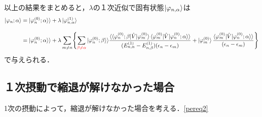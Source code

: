 以上の結果をまとめると，$\lambda$の１次近似で固有状態$\ket{\varphi_{n,\alpha}}$は
\begin{align}
    \ket{\varphi_{n};\alpha}
    &=|\varphi^{(0)}_n;\alpha\rangle\rangle
    +\lambda \ket{\varphi_{n,\alpha}^{(1)}}\\[10pt]
    &=
    |\varphi^{(0)}_n;\alpha\rangle\rangle
    +\lambda\sum_{m\neq n}
    \Biggl\{\sum_{\textcolor{red}{\beta\neq\alpha}}|\varphi^{(0)}_n;\beta\rangle\rangle
    \frac{\langle\braket{\varphi^{(0)}_{n};\beta|\hat{V}|\varphi^{(0)}_m}
    \braket{\varphi^{(0)}_{m}|\hat{V}|\varphi^{(0)}_n;\alpha}\rangle}
    {(E^{(1)}_{n,\alpha}-E^{(1)}_{n,\beta})(\epsilon_n-\epsilon_m)}
    +\ket{\varphi_m^{(0)}}\frac{\braket{\varphi^{(0)}_{m}|\hat{V}|\varphi^{(0)}_n;\alpha}\rangle}{(\epsilon_n-\epsilon_m)}
    \Biggr\}
\end{align}
で与えられる．


\subsection{１次摂動で縮退が解けなかった場合}
1次の摂動によって，縮退が解けなかった場合を考える．\eqref{pereq2}

